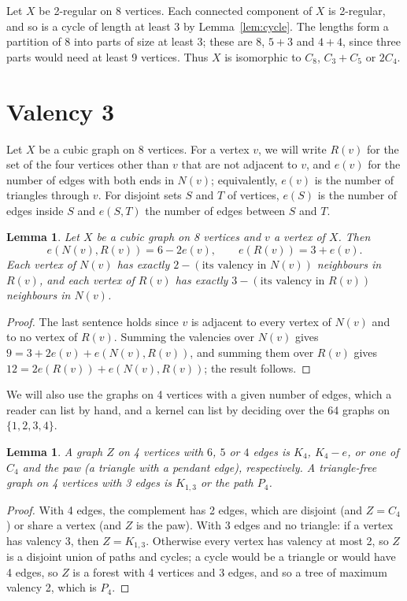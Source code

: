 \documentclass[11pt]{amsart}
\newtheorem{lemma}[theorem]{Lemma}
\theoremstyle{definition}
\newcommand{\nb}{N}
\begin{document}
Let $X$ be 2-regular on 8 vertices. Each connected component of $X$ is 2-regular, and so is a
cycle of length at least 3 by Lemma~\ref{lem:cycle}. The lengths form a partition of 8 into parts
of size at least 3; these are $8$, $5+3$ and $4+4$, since three parts would need at least 9
vertices. Thus $X$ is isomorphic to $C_8$, $C_3+C_5$ or $2C_4$.

\section{Valency 3}\label{sec:cubic}

Let $X$ be a cubic graph on 8 vertices. For a vertex $v$, we will write $R(v)$ for the set of the
four vertices other than $v$ that are not adjacent to $v$, and $e(v)$ for the number of edges with
both ends in $\nb(v)$; equivalently, $e(v)$ is the number of triangles through $v$. For disjoint
sets $S$ and $T$ of vertices, $e(S)$ is the number of edges inside $S$ and $e(S,T)$ the number of
edges between $S$ and $T$.

\begin{lemma}\label{lem:count}
Let $X$ be a cubic graph on 8 vertices and $v$ a vertex of $X$. Then
\[
e(\nb(v),R(v))=6-2e(v),\qquad e(R(v))=3+e(v).
\]
Each vertex of $\nb(v)$ has exactly $2-(\text{its valency in }\nb(v))$ neighbours in $R(v)$, and
each vertex of $R(v)$ has exactly $3-(\text{its valency in }R(v))$ neighbours in $\nb(v)$.
\end{lemma}

\begin{proof}
The last sentence holds since $v$ is adjacent to every vertex of $\nb(v)$ and to no vertex of
$R(v)$. Summing the valencies over $\nb(v)$ gives $9=3+2e(v)+e(\nb(v),R(v))$, and summing them
over $R(v)$ gives $12=2e(R(v))+e(\nb(v),R(v))$; the result follows.
\end{proof}

We will also use the graphs on 4 vertices with a given number of edges, which a reader can list
by hand, and a kernel can list by deciding over the 64 graphs on $\{1,2,3,4\}$.

\begin{lemma}\label{lem:four}
A graph $Z$ on 4 vertices with $6$, $5$ or $4$ edges is $K_4$, $K_4-e$, or one of $C_4$ and the
\emph{paw} (a triangle with a pendant edge), respectively. A triangle-free graph on 4 vertices
with 3 edges is $K_{1,3}$ or the path $P_4$.
\end{lemma}

\begin{proof}
With 4 edges, the complement has 2 edges, which are disjoint (and $Z=C_4$) or share a vertex
(and $Z$ is the paw). With 3 edges and no triangle: if a vertex has valency 3, then $Z=K_{1,3}$.
Otherwise every vertex has valency at most 2, so $Z$ is a disjoint union of paths and cycles; a
cycle would be a triangle or would have 4 edges, so $Z$ is a forest with 4 vertices and 3
edges, and so a tree of maximum valency 2, which is $P_4$.
\end{proof}
\end{document}
